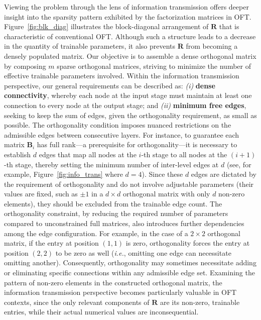 Viewing the problem through the lens of information transmission offers deeper insight into the sparsity pattern exhibited by the factorization matrices in OFT. Figure~\ref{fig:blk_diag} illustrates the block-diagonal arrangement of $\bm{R}$ that is characteristic of conventional OFT. Although such a structure leads to a decrease in the quantity of trainable parameters, it also prevents $\bm{R}$ from becoming a densely populated matrix. Our objective is to assemble a dense orthogonal matrix by composing $m$ sparse orthogonal matrices, striving to minimize the number of effective trainable parameters involved. Within the information transmission perspective, our general requirements can be described as: \emph{(i)} \textbf{dense connectivity}, whereby each node at the input stage must maintain at least one connection to every node at the output stage; and \emph{(ii)} \textbf{minimum free edges}, seeking to keep the sum of edges, given the orthogonality requirement, as small as possible. The orthogonality condition imposes nuanced restrictions on the admissible edges between consecutive layers. For instance, to guarantee each matrix $\bm{B}_i$ has full rank—a prerequisite for orthogonality—it is necessary to establish $d$ edges that map all nodes at the $i$-th stage to all nodes at the $(i+1)$-th stage, thereby setting the minimum number of inter-level edges at $d$ (see, for example, Figure~\ref{fig:info_trans} where $d=4$). Since these $d$ edges are dictated by the requirement of orthogonality and do not involve adjustable parameters (their values are fixed, such as $\pm1$ in a $d\times d$ orthogonal matrix with only $d$ non-zero elements), they should be excluded from the trainable edge count. The orthogonality constraint, by reducing the required number of parameters compared to unconstrained full matrices, also introduces further dependencies among the edge configuration. For example, in the case of a $2\times 2$ orthogonal matrix, if the entry at position $(1,1)$ is zero, orthogonality forces the entry at position $(2,2)$ to be zero as well (\emph{i.e.}, omitting one edge can necessitate omitting another). Consequently, orthogonality may sometimes necessitate adding or eliminating specific connections within any admissible edge set. Examining the pattern of non-zero elements in the constructed orthogonal matrix, the information transmission perspective becomes particularly valuable in OFT contexts, since the only relevant components of $\bm{R}$ are its non-zero, trainable entries, while their actual numerical values are inconsequential.

